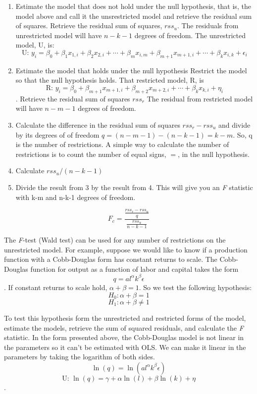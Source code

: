 \documentclass[]{book}
\begin{document}
\begin{enumerate}
\def\labelenumi{\arabic{enumi}.}
\item
  Estimate the model that does not hold under the null hypothesis, that is, the model above and call it the unsrestricted model and retrieve the residual sum of squares. Retrieve the residual sum of squares, \(rss_u\). The residuals from unrestricted model will have \(n-k-1\) degrees of freedom. The unrestricted model, U, is: \[\text{U: }y_i=\beta_0+\beta_1x_{1,i}+\beta_2x_{2,i}+\cdots+\beta_mx_{i,m}+\beta_{m+1}x_{m+1,i}+\cdots+\beta_kx_{i,k} + \epsilon_i\]
\item
  Estimate the model that holds under the null hypothesis Restrict the model so that the null hypothesis holds. That restricted model, R, is \[\text{R: }y_i=\beta_0+\beta_{m+1}x_{m+1,i}+\beta_{m+2}x_{m+2,i}+\cdots+\beta_kx_{k,i} + \eta_i\]. Retrieve the residual sum of squares \(rss_r\) The residual from restricted model will have \(n-m-1\) degrees of freedom.
\item
  Calculate the difference in the residual sum of squares \(rss_r - rss_u\) and divide by its degrees of of freedom \(q = (n-m-1)-(n-k-1) = k-m\). So, q is the number of restrictions. A simple way to calculate the number of restrictions is to count the number of equal signs, \(=\), in the null hypothesis.
\item
  Calculate \(rss_u/(n-k-1)\)
\item
  Divide the result from 3 by the result from 4. This will give you an \emph{F} statistic with k-m and n-k-1 degrees of freedom.
\end{enumerate}

\[F_c=\frac{\frac{rss_r-rss_u}{q}}{\frac{rss_u}{n-k-1}}\]

The \emph{F}-test (Wald test) can be used for any number of restrictions on the unrestricted model. For example, suppose we would like to know if a production function with a Cobb-Douglas form has constant returns to scale. The Cobb-Douglas function for output as a function of labor and capital takes the form \[q=al^\alpha k^\beta\epsilon\]. If constant returns to scale hold, \(\alpha+\beta=1\). So we test the following hypothesis: \[H_0:\alpha+\beta=1\] \[H_1:\alpha+\beta\ne1\]

To test this hypothesis form the unrestricted and restricted forms of the model, estimate the models, retrieve the sum of squared residuals, and calculate the \emph{F} statistic. In the form presented above, the Cobb-Douglas model is not linear in the parameters so it can't be estimated with OLS. We can make it linear in the parameters by taking the logarithm of both sides. \[\ln(q)=\ln(al^\alpha k^\beta\epsilon)\] \[\text{U: }\ln(q)=\gamma+\alpha \ln(l)+\beta\ln(k)+\eta\].
\end{document}
